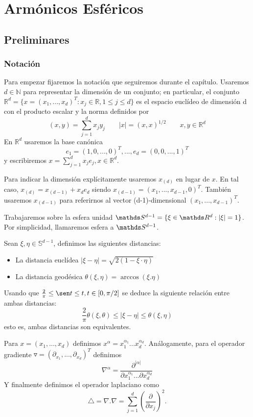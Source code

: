 \chapter[Armónicos Esféricos]
        {Armónicos Esféricos}
\section{Preliminares}
\subsection{Notación}
Para empezar fijaremos la notación que seguiremos durante el capítulo. Usaremos $d\in\mathds{N}$ para representar la dimensión de un conjunto; en particular, el conjunto $\mathds{R}^d = \{x=(x_1,...,x_d)^T : x_j\in\mathds{R},1 \le j \le d\}$ es el espacio euclídeo de dimensión d con el producto escalar y la norma definidos por
$$
(x,y) = \sum_{j=1}^{d} x_jy_j  \qquad |x|=(x,x)^{1/2}  \qquad x,y\in\mathds{R}^d
$$
En $\mathds{R}^d$ usaremos la base canónica
$$
e_1=(1,0,...,0)^T, ..., e_d=(0,0,...,1)^T
$$
y escribiremos $x = \sum_{j=1}^{d} x_je_j, x\in\mathds{R}^d$.
\medskip

Para indicar la dimensión explícitamente usaremos $x_{(d)}$ en lugar de $x$. En tal caso, $x_{(d)} = x_{(d-1)}+x_de_d$ siendo $x_{(d-1)}=(x_1,...,x_{d-1},0)^T$. También usaremos $x_{(d-1)}$ para referirnos al vector (d-1)-dimensional $(x_1,...,x_{d-1})^T$.
\medskip

Trabajaremos sobre la esfera unidad $\sphere = \{\xi\in\R : |\xi| = 1\}$. Por simplicidad, llamaremos esfera a $\sphere$.
\begin{defn} Sean $\xi,\eta\in\mathds{S}^{d-1}$, definimos las siguientes distancias:
	\begin{itemize}
		\item La distancia euclídea $|\xi-\eta| = \sqrt{2(1-\xi\cdot\eta)}$
		\item La distancia geodésica $\theta(\xi,\eta)=\arccos(\xi.\eta)$
	\end{itemize}	
\end{defn}

\begin{rem}Usando que $\frac{2}{\pi} \le \sen t \le t,t\in[0,\pi/2]$ se deduce la siguiente relación entre ambas distancias:
	$$
	\frac{2}{\pi}\theta(\xi,\theta) \le |\xi - \eta| \le \theta(\xi,\eta)
	$$ 
esto es, ambas distancias son equivalentes.
\end{rem}

Para $x =(x_1,...,x_d)$ definimos $x^\alpha = x_1^{\alpha_1}...x_d^{\alpha_d}$. Análogamente,
para el operador gradiente $\triangledown = (\partial_{x_1},...,\partial_{x_d})^T$ definimos
$$
	\nabla^\alpha = \frac{\partial^{|\alpha|}}{\partial x_1^{\alpha_1}...\partial x_d^{\alpha_d}}
$$
Y finalmente definimos el operador laplaciano como
$$ 
	\triangle = \nabla.\nabla = \sum_{j=1}^{d}(\frac{\partial}{\partial x_j})^2 .
$$

